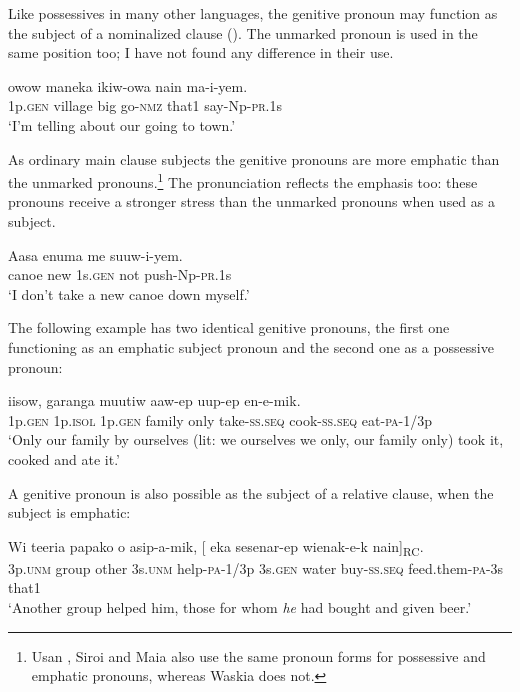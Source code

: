 Like possessives in many other languages, the genitive pronoun may function as the subject of a nominalized clause (). The unmarked pronoun is used in the same position too; I have not found any difference in their use.

\ea%
\label{ex:3:x571}
\gll {} owow maneka ikiw-owa nain ma-i-yem. \\
1p.\textsc{gen} village big go-\textsc{nmz} that1 say-Np-\textsc{pr}.1s\\
\glt`I'm telling about our going to town.'
\z

As ordinary main clause subjects the genitive pronouns are more emphatic than the unmarked pronouns.\footnote{Usan \citep[55]{Reesink1984}, Siroi \citep[20]{Wells1979} and Maia \citep[73]{Hardin2002} also use the same pronoun forms for possessive and emphatic pronouns, whereas Waskia \citep{RossEtAl1978} does not.} The pronunciation reflects the emphasis too: these pronouns receive a stronger stress than the unmarked pronouns when used as a subject.

\ea%
\label{ex:3:x572}
\gll Aasa enuma  me suuw-i-yem. \\
canoe new 1s.\textsc{gen} not push-Np-\textsc{pr}.1s\\
\glt`I don't take a new canoe down myself.'
\z

The following example has two identical genitive pronouns, the first one functioning as an emphatic subject pronoun and the second one as a possessive pronoun:

\ea%
\label{ex:3:x686}
\gll {} iisow,  garanga muutiw aaw-ep uup-ep en-e-mik.\\
1p.\textsc{gen} 1p.\textsc{isol} 1p.\textsc{gen} family only take-\textsc{ss}.\textsc{seq} cook-\textsc{ss}.\textsc{seq} eat-\textsc{pa}-1/3p\\
\glt`Only our family by ourselves (lit: we ourselves we only, our family only) took it, cooked and ate it.'
\z

A genitive pronoun is also possible as the subject of a relative clause, when the subject is emphatic:

\ea%
\label{ex:3:x1809}
\gll Wi teeria papako o asip-a-mik, [ eka sesenar-ep wienak-e-k nain]\textsubscript{RC}.
\\
3p.\textsc{unm} group other 3s.\textsc{unm} help-\textsc{pa}-1/3p 3s.\textsc{gen} water buy-\textsc{ss}.\textsc{seq} feed.them-\textsc{pa}-3s that1\\
\glt`Another group helped him, those for whom \textit{he} had bought and given beer.'
\z

